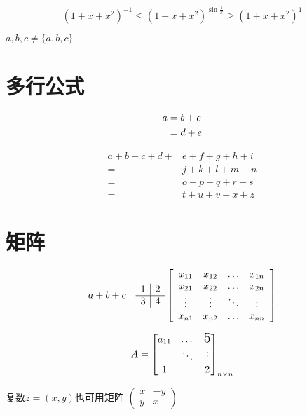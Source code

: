 \documentclass{article}
\begin{document}
\[(1 + x + x^2)^{-1} \leqslant (1 + x + x^2)^{\sin\frac{1}{x}} \geqslant (1+x+x^2)^{1}\] %


${a,b,c}\neq \{a,b,c\}$

\section{多行公式}
\begin{align} 
a & = b + c \notag \\ 
&=d+e 
\end{align}

\[
\begin{aligned} 
a+b+c+d+& e+f+g+h+i \\
=& j+k+l+m+n \\
=& o+p+q+r+s \\ 
=& t+u+v+x+z \end{aligned}
\]
\section{矩阵}
\[
a + b \\ + c\quad %
\begin{array}{l | l}
{1} & {2} \\ 
\hline
{3} & {4}
\end{array} 
\left[\begin{array}{cccc}
{x_{11}} & {x_{12}} & {\dots} & {x_{1 n}} \\ 
{x_{21}} & {x_{22}} & {\dots} & {x_{2 n}} \\ 
{\vdots} & {\vdots} & {\ddots} & {\vdots} \\ 
{x_{n 1}} & {x_{n 2}} & {\dots} & {x_{n n}}
\end{array}\right]
\]

\[
A = \begin{bmatrix}
a_{11} & \dots & \text{\Large5}\\ %
& \ddots  & \vdots \\ %
1 &  & 2    
\end{bmatrix}_{n \times n} %
\]

复数$z = (x, y)$也可用矩阵 
\begin{math}
\left(\begin{smallmatrix}
x & -y \\
y & x   
\end{smallmatrix}\right) %
\end{math}
\end{document}
